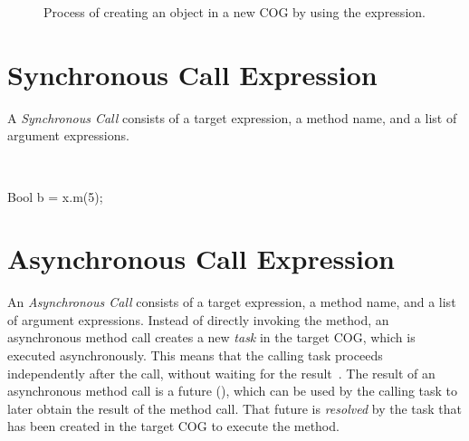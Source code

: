 \begin{figure}
\centering
{}
\caption{Process of creating an object in a new COG by using the  expression.}
\label{fig:newCogExpr}
\end{figure}


\section{Synchronous Call Expression}
A \emph{Synchronous Call} consists of a target expression, a method name, and a list of argument expressions.

\begin{abssyntax}
  {}\ \ \ \TRS{(}  \TRS{)}  
\end{abssyntax}

\begin{absexample}
Bool b = x.m(5);  
\end{absexample}

\section{Asynchronous Call Expression}
An \emph{Asynchronous Call} consists of a target expression, a method name, and a list of argument expressions.
Instead of directly invoking the method, an asynchronous method call creates a new \emph{task} in the target COG, which is executed asynchronously. This means that the calling task proceeds independently after the call, without waiting for the result~\cite{johnsen10fmco}.
The result of an asynchronous method call is a future (), which can be used by the calling
task to later obtain the result of the method call.
That future is \emph{resolved} by the task that has been created in the target COG to execute the method.

